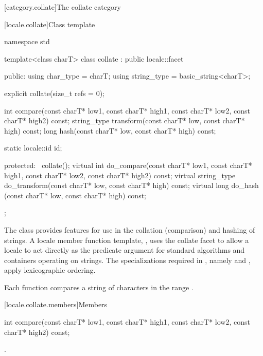 [category.collate]{The collate category}

[locale.collate]{Class template }

%
\begin{codeblock}
namespace std {
  template<class charT>
    class collate : public locale::facet {
    public:
      using char_type   = charT;
      using string_type = basic_string<charT>;

      explicit collate(size_t refs = 0);

      int compare(const charT* low1, const charT* high1,
                  const charT* low2, const charT* high2) const;
      string_type transform(const charT* low, const charT* high) const;
      long hash(const charT* low, const charT* high) const;

      static locale::id id;

    protected:
      ~collate();
      virtual int do_compare(const charT* low1, const charT* high1,
                             const charT* low2, const charT* high2) const;
      virtual string_type do_transform(const charT* low, const charT* high) const;
      virtual long do_hash (const charT* low, const charT* high) const;
    };
}
\end{codeblock}

\pnum
The class
provides features for use in the
collation (comparison) and hashing of strings.
A locale member function template,
,
uses the collate facet to allow a locale to act directly as the predicate
argument for standard algorithms and containers operating on strings.
The specializations required in , namely
and
,
apply lexicographic ordering.

\pnum
Each function compares a string of characters
in the range
.

[locale.collate.members]{Members}

%
\begin{itemdecl}
int compare(const charT* low1, const charT* high1,
            const charT* low2, const charT* high2) const;
\end{itemdecl}

\begin{itemdescr}
\pnum
\returns
{}.
\end{itemdescr}

